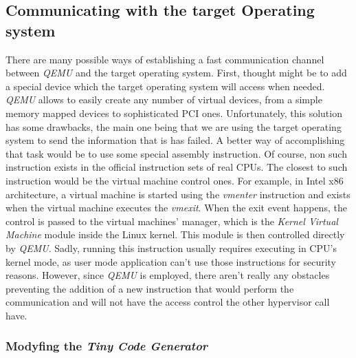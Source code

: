 \subsection{Communicating with the target Operating system}
There are many possible ways of establishing a fast communication channel between \textit{QEMU} and the target operating system. First, thought might be to add a special device which the target operating system will access when needed. \textit{QEMU} allows to easily create any number of virtual devices, from a simple memory mapped devices to sophisticated PCI ones. Unfortunately, this solution has some drawbacks, the main one being that we are using the target operating system to send the information that is has failed. A better way of accomplishing that task would be to use some special assembly instruction. Of course, non such instruction exists in the official instruction sets of real CPUs. The closest to such instruction would be the virtual machine control ones. For example, in Intel x86 architecture, a virtual machine is started using the \textit{vmenter} instruction and exists when the virtual machine executes the \textit{vmexit}. When the exit event happens, the control is passed to the virtual machines' manager, which is the \textit{Kernel Virtual Machine} module inside the Linux kernel. This module is then controlled directly by \textit{QEMU}. Sadly, running this instruction usually requires executing in CPU's kernel mode, as user mode application can't use those instructions for security reasons. However, since \textit{QEMU} is employed, there aren't really any obstacles preventing the addition of a new instruction that would perform the communication and will not have the access control the other hypervisor call have.

\subsubsection{Modyfing the \textit{Tiny Code Generator}} \label{sec:tcg}
